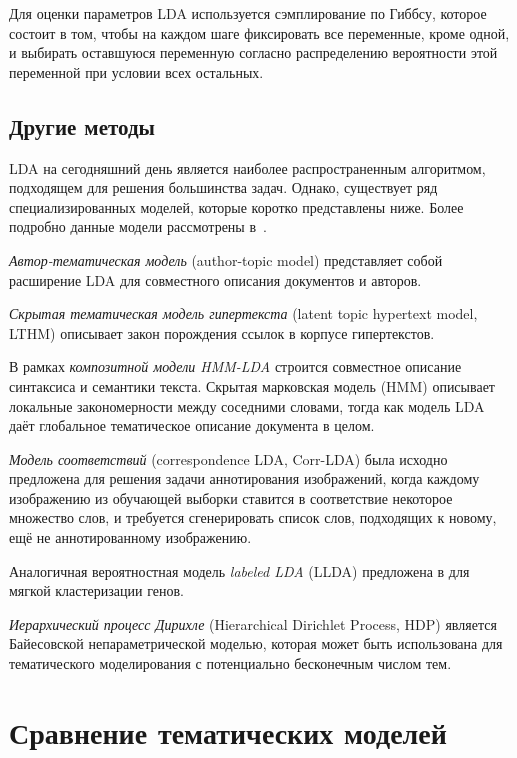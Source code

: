 Для оценки параметров LDA используется сэмплирование по Гиббсу, которое состоит в том, чтобы на каждом шаге фиксировать все переменные, кроме одной, и выбирать оставшуюся переменную согласно распределению вероятности этой переменной при условии всех остальных.

\subsection{Другие методы}

LDA на сегодняшний день является наиболее распространенным алгоритмом, подходящем для решения большинства задач. Однако, существует ряд специализированных моделей, которые коротко представлены ниже. Более подробно данные модели рассмотрены в~\cite{TM}.

\textit{Автор-тематическая модель} (author-topic model) представляет собой расширение LDA для совместного описания документов и авторов.

\textit{Скрытая тематическая модель гипертекста} (latent topic hypertext model, LTHM) описывает закон порождения ссылок в корпусе гипертекстов.

В рамках \textit{композитной модели HMM-LDA} строится совместное описание синтаксиса и семантики текста. Скрытая марковская модель (HMM) описывает локальные закономерности между соседними словами, тогда как модель LDA даёт глобальное тематическое описание документа в целом.

\textit{Модель соответствий} (correspondence LDA, Corr-LDA) была исходно предложена для решения задачи аннотирования изображений, когда каждому изображению из обучающей выборки ставится в соответствие некоторое множество слов, и требуется сгенерировать список слов, подходящих к новому, ещё не аннотированному изображению.

Аналогичная вероятностная модель \textit{labeled LDA} (LLDA) предложена в для мягкой кластеризации генов.

\textit{Иерархический процесс Дирихле} (Hierarchical Dirichlet Process, HDP) является Байесовской непараметрической моделью, которая может быть использована для тематического моделирования с потенциально бесконечным числом тем.

\section{Сравнение тематических моделей}
\label{sec:tm_comparison}


